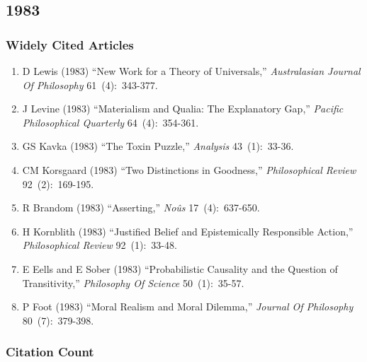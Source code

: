 \documentclass[
  10pt,
  letterpaper,
  DIV=11,
  numbers=noendperiod,
  twoside]{scrartcl}
\providecommand{\tightlist}{%
  \setlength{\itemsep}{0pt}\setlength{\parskip}{0pt}}\usepackage{longtable,booktabs,array}
\begin{document}
\newpage

\subsection{1983}\label{sec-s1983}

\subsubsection*{Widely Cited Articles}\label{widely-cited-articles-27}

\begin{enumerate}
\def\labelenumi{\arabic{enumi}.}
\tightlist
\item
  D Lewis (1983) ``New Work for a Theory of Universals,''
  \emph{Australasian Journal Of Philosophy} 61~(4):~343-377.
\item
  J Levine (1983) ``Materialism and Qualia: The Explanatory Gap,''
  \emph{Pacific Philosophical Quarterly} 64~(4):~354-361.
\item
  GS Kavka (1983) ``The Toxin Puzzle,'' \emph{Analysis} 43~(1):~33-36.
\item
  CM Korsgaard (1983) ``Two Distinctions in Goodness,''
  \emph{Philosophical Review} 92~(2):~169-195.
\item
  R Brandom (1983) ``Asserting,'' \emph{Noûs} 17~(4):~637-650.
\item
  H Kornblith (1983) ``Justified Belief and Epistemically Responsible
  Action,'' \emph{Philosophical Review} 92~(1):~33-48.
\item
  E Eells and E Sober (1983) ``Probabilistic Causality and the Question
  of Transitivity,'' \emph{Philosophy Of Science} 50~(1):~35-57.
\item
  P Foot (1983) ``Moral Realism and Moral Dilemma,'' \emph{Journal Of
  Philosophy} 80~(7):~379-398.
\end{enumerate}

\subsubsection*{Citation Count}\label{sec-count-1983}
\end{document}

